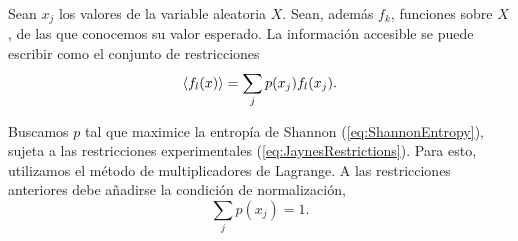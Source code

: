 
Sean $x_{j}$ los valores de la variable aleatoria $X$. Sean, además $f_{k}$, funciones sobre $X$, de las que conocemos su valor esperado. La información accesible se puede escribir como el conjunto de restricciones
\begin{equation}\label{eq:JaynesRestrictions}
    \expval{f_{l}(x)}=\sum_{j}p(x_{j})f_{l}(x_{j}).
\end{equation}


Buscamos $p$ tal que maximice la entropía de Shannon (\ref{eq:ShannonEntropy}), sujeta a las restricciones experimentales (\ref{eq:JaynesRestrictions}). Para esto, utilizamos el método de multiplicadores de Lagrange. A las restricciones anteriores debe añadirse la condición de normalización,
\begin{equation}\label{eq:NormalizationRestriction}
    \sum_{j}p(x_{j})=1.
\end{equation}

